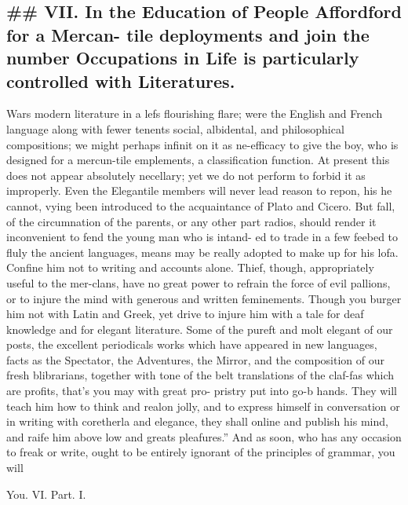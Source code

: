 \subsection*{\#\# VII. In the Education of People Affordford for a Mercan- tile deployments and join the number Occupations in Life is particularly controlled with Literatures.}
Wars modern literature in a lefs flourishing flare; were the English and French language along with fewer tenents social, albidental, and philosophical compositions; we might perhaps infinit on it as ne-efficacy to give the boy, who is designed for a mercun-tile emplements, a classification function. At present this does not appear absolutely necellary; yet we do not perform to forbid it as improperly. Even the Elegantile members will never lead reason to repon, his he cannot, vying been introduced to the acquaintance of Plato and Cicero. But fall, of the circumnation of the parents, or any other part radios, should render it inconvenient to fend the young man who is intand- ed to trade in a few feebed to fluly the ancient languages, means may be really adopted to make up for his lofa. Confine him not to writing and accounts alone. Thief, though, appropriately useful to the mer-clans, have no great power to refrain the force of evil pallions, or to injure the mind with generous and written feminements. Though you burger him not with Latin and Greek, yet drive to injure him with a tale for deaf knowledge and for elegant literature. Some of the pureft and molt elegant of our posts, the excellent periodicals works which have appeared in new languages, facts as the Spectator, the Adventures, the Mirror, and the composition of our fresh blibrarians, together with tone of the belt translations of the claf-fas which are profits, that’s you may with great pro- pristry put into go-b hands. They will teach him how to think and realon jolly, and to express himself in conversation or in writing with coretherla and elegance, they shall online and publish his mind, and raife him above low and greats pleafures.” And as soon, who has any occasion to freak or write, ought to be entirely ignorant of the principles of grammar, you will\par\medskip
You. VI. Part. I.\par\medskip
